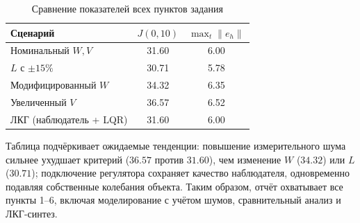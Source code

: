 \begin{table}[H]
    \centering
    \begin{tabular}{lcc}
        \toprule
        Сценарий & \(J(0,10)\) & \(\max_t\|e_h\|\) \\
        \midrule
        Номинальный \(W,V\) & 31.60 & 6.00 \\
        \(L\) с \(\pm15\%\) & 30.71 & 5.78 \\
        Модифицированный \(W\) & 34.32 & 6.35 \\
        Увеличенный \(V\) & 36.57 & 6.52 \\
        ЛКГ (наблюдатель + LQR) & 31.60 & 6.00 \\
        \bottomrule
    \end{tabular}
    \caption{Сравнение показателей всех пунктов задания}
\end{table}

Таблица подчёркивает ожидаемые тенденции: повышение измерительного шума сильнее ухудшает критерий (\(36.57\) против \(31.60\)), чем изменение \(W\) (\(34.32\)) или \(L\) (\(30.71\)); подключение регулятора сохраняет качество наблюдателя, одновременно подавляя собственные колебания объекта. Таким образом, отчёт охватывает все пункты 1–6, включая моделирование с учётом шумов, сравнительный анализ и ЛКГ-синтез.

